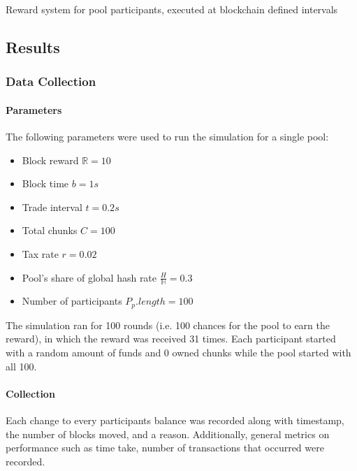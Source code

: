 \begin{algorithm}[H]
  \caption{Reward system for pool participants, executed at blockchain defined intervals}
  \label{algorithm:reward}
  \begin{algorithmic}[1]
     
         
      \EndFor
    \EndProcedure
  \end{algorithmic}
\end{algorithm}

\subsection{Results}

\subsubsection{Data Collection}

\paragraph{Parameters} The following parameters were used to run the simulation for a single pool:

\begin{itemize}
  \item Block reward $\mathbb{R} = 10$
  \item Block time $b = 1s$
  \item Trade interval $t = 0.2s$
  \item Total chunks $C = 100$
  \item Tax rate $r = 0.02$
  \item Pool's share of global hash rate $\frac{H}{\mathbb{H}} = 0.3$
  \item Number of participants $P_p.length = 100$
\end{itemize}
The simulation ran for 100 rounds (i.e. 100 chances for the pool to earn the reward), in which the reward was received 31 times. Each participant started with a random amount of funds and 0 owned chunks while the pool started with all 100.

\paragraph{Collection} Each change to every participants balance was recorded along with timestamp, the number of blocks moved, and a reason. Additionally, general metrics on performance such as time take, number of transactions that occurred were recorded.

